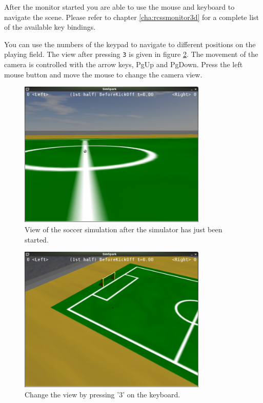 \begin{itemize}
After the monitor started you are able to use the mouse and keyboard
to navigate the scene. Please refer to chapter
\ref{cha:rcssmonitor3d} for a complete list of the available key bindings. 

You can use the numbers of the keypad to navigate to different
positions on the playing field. The view after pressing \texttt{3} is
given in figure \ref{fig:press3}. The movement of the camera is
controlled with the arrow keys, PgUp and PgDown. Press the left mouse
button and move the mouse to change the camera view.


\begin{figure}[htbp]
\begin{center}
\includegraphics[width=0.8\textwidth]{fig/startup}
\caption{View of the soccer simulation after the simulator has just been started.}
\label{fig:startup}
\end{center}
\end{figure}

\begin{figure}[htbp]
\begin{center}
\includegraphics[width=0.8\textwidth]{fig/press3}
\caption{Change the view by pressing '3' on the keyboard.}
\label{fig:press3}
\end{center}
\end{figure}



\end{itemize}
